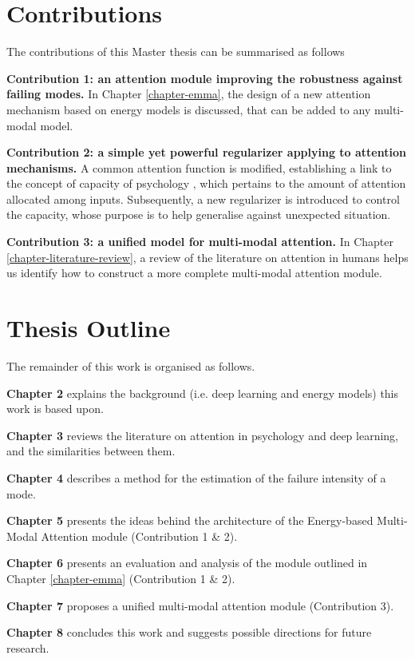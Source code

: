 \section{Contributions}
The contributions of this Master thesis can be summarised as follows
\begin{description}
\item \textbf{Contribution 1: an attention module improving the robustness against failing modes.} In Chapter \ref{chapter-emma}, the design of a new attention mechanism based on energy models \citep{ebm-tutorial} is discussed, that can be added to any multi-modal model. 
\item \textbf{Contribution 2: a simple yet powerful regularizer applying to attention mechanisms.} A common attention function is modified, establishing a link to the concept of capacity of psychology \citep{attention-is-effort}, which pertains to the amount of attention allocated among inputs. Subsequently, a new regularizer is introduced to control the capacity, whose purpose is to help generalise against unexpected situation.
\item \textbf{Contribution 3: a unified model for multi-modal attention.} In Chapter \ref{chapter-literature-review}, a review of the literature on attention in humans helps us identify how to construct a more complete multi-modal attention module.
\end{description}


\section{Thesis Outline}
The remainder of this work is organised as follows.
\begin{description}
\item \textbf{Chapter 2} explains the background (i.e. deep learning and energy models) this work is based upon.
\item \textbf{Chapter 3} reviews the literature on attention in psychology and deep learning, and the similarities between them.
\item \textbf{Chapter 4} describes a method for the estimation of the failure intensity of a mode.
\item \textbf{Chapter 5} presents the ideas behind the architecture of the Energy-based Multi-Modal Attention module (Contribution 1 \& 2).
\item \textbf{Chapter 6} presents an evaluation and analysis of the module outlined in Chapter \ref{chapter-emma} (Contribution 1 \& 2).
\item \textbf{Chapter 7} proposes a unified multi-modal attention module (Contribution 3).
\item \textbf{Chapter 8} concludes this work and suggests possible directions for future research.
\end{description}